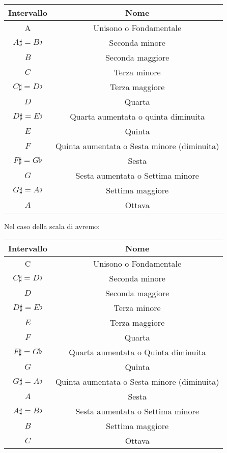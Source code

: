 \documentclass[12pt,a4paper]{book}
\theoremstyle{definition}
\theoremstyle{Theorem}
\theoremstyle{definition}
\theoremstyle{definition}
\theoremstyle{definition}
\begin{document}
	  \begin{center}
	  	\begin{tabular}{||c|c||} 
	  		\hline
	  		Intervallo & Nome \\ [0.5ex] 
	  		\hline\hline
	  		A & Unisono o Fondamentale \\ 
	  		\hline
	  		$A\sharp=B\flat$ & Seconda minore \\
	  		\hline
	  		$B$ & Seconda maggiore\\
	  		\hline
	  		$C$ & Terza minore\\
	  		\hline
	  		$C\sharp=D\flat$ & Terza maggiore \\ [1ex] 
	  		\hline
	  		$D$ & Quarta \\
	  		\hline
	  		$D\sharp=E\flat$ & Quarta aumentata o quinta diminuita\\
	  		\hline
	  		$E$ & Quinta\\
	  		\hline
	  		$F$ & Quinta aumentata o Sesta minore (diminuita) \\ [1ex] 
	  		\hline
	  		$F\sharp=G\flat$ & Sesta \\
	  		\hline
	  		$G$ & Sesta aumentata o Settima minore\\
	  		\hline
	  		$G\sharp=A\flat$ & Settima maggiore\\
	  		\hline
	  		$A$ & Ottava \\  
	  		\hline
	  	\end{tabular}
	  \end{center}
	  Nel caso della scala di avremo:
	  	  \begin{center}
	  	  	
	  	\begin{tabular}{||c|c||} 
	  		 
	  		\hline
	  		Intervallo & Nome \\ [0.5ex] 
	  		\hline\hline
	  		C & Unisono o Fondamentale \\ 
	  		\hline
	  		$C\sharp=D\flat$ & Seconda minore \\
	  		\hline
	  		$D$ & Seconda maggiore\\
	  		\hline
	  		$D\sharp=E\flat$ & Terza minore\\
	  		\hline
	  		$E$ & Terza maggiore \\ [1ex] 
	  		\hline
	  		$F$ & Quarta \\
	  		\hline
	  		$F\sharp=G\flat$ & Quarta aumentata o Quinta diminuita\\
	  		\hline
	  		$G$ & Quinta\\
	  		\hline
	  		$G\sharp=A\flat$ & Quinta aumentata o Sesta minore (diminuita) \\  
	  		\hline
	  		$A$ & Sesta \\
	  		\hline
	  		$A\sharp=B\flat$ & Sesta aumentata o Settima minore\\
	  		\hline
	  		$B$ & Settima maggiore\\
	  		\hline
	  		$C$ & Ottava \\  
	  		\hline
	  	\end{tabular}
	  \end{center}
\end{document}

